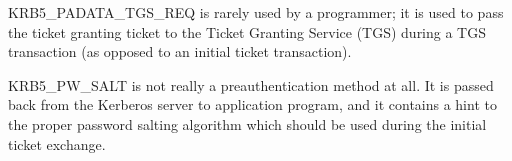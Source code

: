 KRB5_PADATA_TGS_REQ is rarely used by a programmer; it is used to pass
the ticket granting ticket to the Ticket Granting Service (TGS) during a
TGS transaction (as opposed to an initial ticket transaction).

KRB5_PW_SALT is not really a preauthentication method at all.  It is
passed back from the Kerberos server to application program, and it
contains a hint to the proper password salting algorithm which should be
used during the initial ticket exchange.

%


